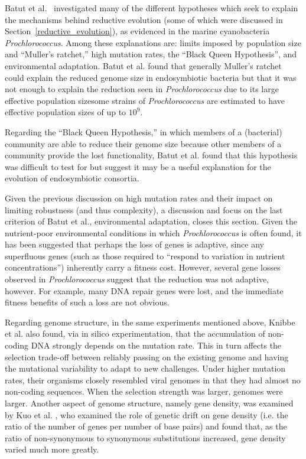 Batut et al.~\cite{Batut.2014} investigated many of the different hypotheses which seek to explain the mechanisms behind reductive evolution (some of which were discussed in Section~\ref{reductive_evolution}), as evidenced in the marine cyanobacteria \textit{Prochlorococcus}. Among these explanations are: limits imposed by population size and ``Muller's ratchet,'' high mutation rates, the ``Black Queen Hypothesis'', and environmental adaptation. Batut et al. found that generally Muller's ratchet could explain the reduced genome size in endosymbiotic bacteria but that it was not enough to explain the reduction seen in \textit{Prochlorococcus} due to its large effective population size\textemdash some strains of \textit{Prochlorococcus} are estimated to have effective population sizes of up to $10^9$.  

Regarding the ``Black Queen Hypothesis,'' in which members of a (bacterial) community are able to reduce their genome size because other members of a community provide the lost functionality, Batut et al. found that this hypothesis was difficult to test for but suggest it may be a useful explanation for the evolution of endosymbiotic consortia.  

Given the previous discussion on high mutation rates and their impact on limiting robustness (and thus complexity), a discussion and focus on the last criterion of Batut et al., environmental adaptation, closes this section. Given the nutrient-poor environmental conditions in which \textit{Prochlorococcus} is often found, it has been suggested that perhaps the loss of genes is adaptive, since any superfluous genes (such as those required to ``respond to variation in nutrient concentrations'') inherently carry a fitness cost. However, several gene losses observed in \textit{Prochlorococcus} suggest that the reduction was not adaptive, however. For example, many DNA repair genes were lost, and the immediate fitness benefits of such a loss are not obvious. 

Regarding genome structure, in the same experiments mentioned above, Knibbe et al.\cite{Knibbe2007} also found, via in silico experimentation, that the accumulation of non-coding DNA strongly depends on the mutation rate. This in turn affects the selection trade-off between reliably passing on the existing genome and having the mutational variability to adapt to new challenges.  Under higher mutation rates, their organisms closely resembled viral genomes in that they had almost no non-coding sequences. When the selection strength was larger, genomes were larger.  Another aspect of genome structure, namely gene density, was examined by Kuo et al. \cite{kuo2009consequences}, who examined the role of genetic drift on gene density (i.e. the ratio of the number of genes per number of base pairs) and found that, as the ratio of non-synonymous to synonymous substitutions increased, gene density varied much more greatly.
